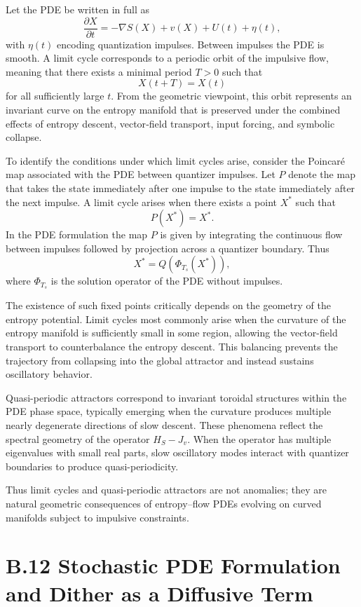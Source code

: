 Let the PDE be written in full as
\[
\frac{\partial X}{\partial t} 
= -\nabla S(X) + v(X) + U(t) + \eta(t),
\]
with \(\eta(t)\) encoding quantization impulses. Between impulses the PDE is smooth. A limit cycle corresponds to a periodic orbit of the impulsive flow, meaning that there exists a minimal period \(T > 0\) such that
\[
X(t + T) = X(t)
\]
for all sufficiently large \(t\). From the geometric viewpoint, this orbit represents an invariant curve on the entropy manifold that is preserved under the combined effects of entropy descent, vector‐field transport, input forcing, and symbolic collapse.

To identify the conditions under which limit cycles arise, consider the Poincaré map associated with the PDE between quantizer impulses. Let \(P\) denote the map that takes the state immediately after one impulse to the state immediately after the next impulse. A limit cycle arises when there exists a point \(X^{\ast}\) such that
\[
P(X^{\ast}) = X^{\ast}.
\]
In the PDE formulation the map \(P\) is given by integrating the continuous flow between impulses followed by projection across a quantizer boundary. Thus
\[
X^{\ast}
= Q\!\left(\Phi_{T_s}(X^{\ast})\right),
\]
where \(\Phi_{T_s}\) is the solution operator of the PDE without impulses.

The existence of such fixed points critically depends on the geometry of the entropy potential. Limit cycles most commonly arise when the curvature of the entropy manifold is sufficiently small in some region, allowing the vector-field transport to counterbalance the entropy descent. This balancing prevents the trajectory from collapsing into the global attractor and instead sustains oscillatory behavior.

Quasi-periodic attractors correspond to invariant toroidal structures within the PDE phase space, typically emerging when the curvature produces multiple nearly degenerate directions of slow descent. These phenomena reflect the spectral geometry of the operator \(H_{S} - J_{v}\). When the operator has multiple eigenvalues with small real parts, slow oscillatory modes interact with quantizer boundaries to produce quasi-periodicity.

Thus limit cycles and quasi-periodic attractors are not anomalies; they are natural geometric consequences of entropy–flow PDEs evolving on curved manifolds subject to impulsive constraints.

\section{B.12 Stochastic PDE Formulation and Dither as a Diffusive Term}

